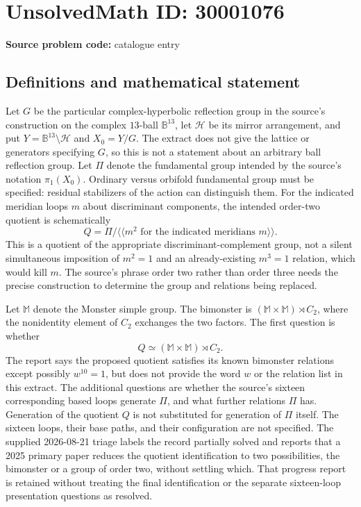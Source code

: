 \documentclass[11pt]{article}
\begin{document}
\section*{UnsolvedMath ID: 30001076}
\textbf{Source problem code:} catalogue entry
\subsection{Definitions and mathematical statement}
Let $G$ be the particular complex-hyperbolic reflection group in the source's construction on the complex $13$-ball $\mathbb B^{13}$, let $\mathcal H$ be its mirror arrangement, and put $Y=\mathbb B^{13}\setminus\mathcal H$ and $X_0=Y/G$. The extract does not give the lattice or generators specifying $G$, so this is not a statement about an arbitrary ball reflection group. Let $\Pi$ denote the fundamental group intended by the source's notation $\pi_1(X_0)$. Ordinary versus orbifold fundamental group must be specified: residual stabilizers of the action can distinguish them. For the indicated meridian loops $m$ about discriminant components, the intended order-two quotient is schematically \[Q=\Pi/\langle\!\langle m^2\text{ for the indicated meridians }m\rangle\!\rangle.\] This is a quotient of the appropriate discriminant-complement group, not a silent simultaneous imposition of $m^2=1$ and an already-existing $m^3=1$ relation, which would kill $m$. The source's phrase order two rather than order three needs the precise construction to determine the group and relations being replaced.\par Let $\mathbb M$ denote the Monster simple group. The bimonster is $(\mathbb M\times\mathbb M)\rtimes C_2$, where the nonidentity element of $C_2$ exchanges the two factors. The first question is whether \[Q\simeq(\mathbb M\times\mathbb M)\rtimes C_2.\] The report says the proposed quotient satisfies its known bimonster relations except possibly $w^{10}=1$, but does not provide the word $w$ or the relation list in this extract. The additional questions are whether the source's sixteen corresponding based loops generate $\Pi$, and what further relations $\Pi$ has. Generation of the quotient $Q$ is not substituted for generation of $\Pi$ itself. The sixteen loops, their base paths, and their configuration are not specified. The supplied 2026-08-21 triage labels the record partially solved and reports that a 2025 primary paper reduces the quotient identification to two possibilities, the bimonster or a group of order two, without settling which. That progress report is retained without treating the final identification or the separate sixteen-loop presentation questions as resolved.
\end{document}
